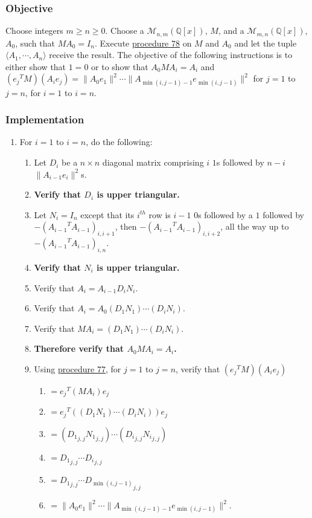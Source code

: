 \documentclass[twocolumn]{article}
\begin{document}
			\subsubsection{Objective}
				Choose integers $m\ge n\ge 0$. Choose a $\mathcal{M}_{n,m}(\mathbb{Q}[x])$, $M$, and a $\mathcal{M}_{m,n}(\mathbb{Q}[x])$, $A_0$, such that $MA_0=I_n$. Execute \hyperref[sec:procedure 78]{procedure 78} on $M$ and $A_0$ and let the tuple $\langle A_1,\cdots,A_n\rangle$ receive the result. The objective of the following instructions is to either show that $1=0$ or to show that $A_0MA_i=A_i$ and $({e_j}^TM)(A_ie_j)=\lVert A_0e_1\rVert^2\cdots\lVert A_{\min(i,j-1)-1}e_{\min(i,j-1)}\rVert^2$ for $j=1$ to $j=n$, for $i=1$ to $i=n$.
			\subsubsection{Implementation}
				\begin{enumerate}
					\item For $i=1$ to $i=n$, do the following:
					\begin{enumerate}
						\item Let $D_i$ be a $n\times n$ diagonal matrix comprising $i$ $1$s followed by $n-i$ $\lVert A_{i-1}e_i\rVert^2$s.
						\item \textbf{Verify that $D_i$ is upper triangular.}
						\item Let $N_i=I_n$ except that its $i^{th}$ row is $i-1$ $0$s followed by a $1$ followed by $-({A_{i-1}}^TA_{i-1})_{i,i+1}$, then $-({A_{i-1}}^TA_{i-1})_{i,i+2}$, all the way up to $-({A_{i-1}}^TA_{i-1})_{i,n}$.
						\item \textbf{Verify that $N_i$ is upper triangular.}
						\item Verify that $A_i=A_{i-1}D_iN_i$.
						\item Verify that $A_i=A_0(D_1N_1)\cdots (D_iN_i)$.
						\item Verify that $MA_i=(D_1N_1)\cdots (D_iN_i)$.
						\item \textbf{Therefore verify that $A_0MA_i=A_i$.}
						\item Using \hyperref[sec:procedure 77]{procedure 77}, for $j=1$ to $j=n$, verify that $({e_j}^TM)(A_ie_j)$
						\begin{enumerate}
							\item $={e_j}^T(MA_i)e_j$
							\item $={e_j}^T((D_1N_1)\cdots (D_iN_i))e_j$
							\item $=({D_1}_{j,j}{N_1}_{j,j})\cdots ({D_i}_{j,j}{N_i}_{j,j})$
							\item $={D_1}_{j,j}\cdots {D_i}_{j,j}$
							\item $={D_1}_{j,j}\cdots {D_{\min(i,j-1)}}_{j,j}$
							\item $=\lVert A_0e_1\rVert^2\cdots\lVert A_{\min(i,j-1)-1}e_{\min(i,j-1)}\rVert^2$.
						\end{enumerate}
					\end{enumerate}
				\end{enumerate}
\end{document}
